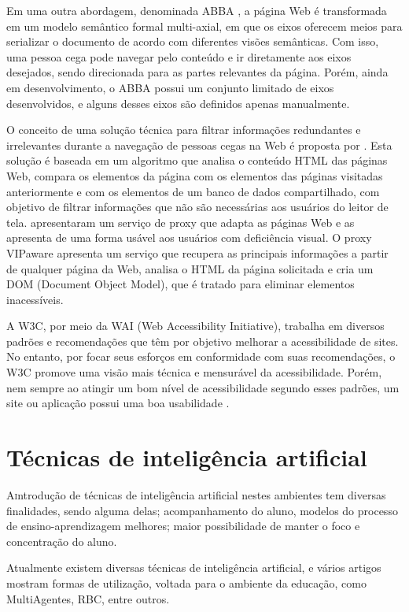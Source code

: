 Em uma outra abordagem, denominada ABBA \cite{Fayzrakhmanov2010}, a página Web é transformada 
em um modelo semântico formal multi-axial, em que os eixos oferecem meios para serializar o 
documento de acordo com diferentes visões semânticas. Com isso, uma pessoa cega pode navegar 
pelo conteúdo e ir diretamente aos eixos desejados, sendo direcionada para as partes relevantes 
da página. Porém, ainda em desenvolvimento, o ABBA possui um conjunto limitado de eixos desenvolvidos, 
e alguns desses eixos são definidos apenas manualmente.

O conceito de uma solução técnica para filtrar informações redundantes e irrelevantes durante a navegação 
de pessoas cegas na Web é proposta por \cite{Steiner2015}. Esta solução é baseada em um 
algoritmo que analisa o conteúdo HTML das páginas Web, compara os elementos da página com os elementos das 
páginas visitadas anteriormente e com os elementos de um banco de dados compartilhado, com objetivo 
de filtrar informações que não são necessárias aos usuários do leitor de tela. 
\cite{Authors2016} apresentaram um serviço de proxy que adapta as páginas Web e as apresenta de uma 
forma usável aos usuários com deficiência visual. O proxy VIPaware apresenta um serviço que recupera as 
principais informações a partir de qualquer página da Web, analisa o HTML da página solicitada e cria 
um DOM (Document Object Model), que é tratado para eliminar elementos inacessíveis.

A W3C, por meio da WAI (Web Accessibility Initiative), trabalha em diversos padrões
e recomendações que têm por objetivo melhorar a acessibilidade de sites. No entanto,
por focar seus esforços em conformidade com suas recomendações, o W3C promove uma
visão mais técnica e mensurável da acessibilidade. Porém, nem sempre ao atingir um
bom nível de acessibilidade segundo esses padrões, um site ou aplicação possui uma boa
usabilidade \cite{Petrie2007}.

\section{Técnicas de inteligência artificial}
\lettrine{A} introdução de técnicas de inteligência artificial nestes ambientes tem diversas finalidades, 
sendo alguma delas;  acompanhamento do aluno, modelos do processo de ensino-aprendizagem melhores; maior 
possibilidade de manter o foco e concentração do aluno.

Atualmente existem diversas técnicas de inteligência artificial, e vários artigos mostram formas de utilização, 
voltada para o ambiente da educação, como MultiAgentes, RBC, entre outros.

